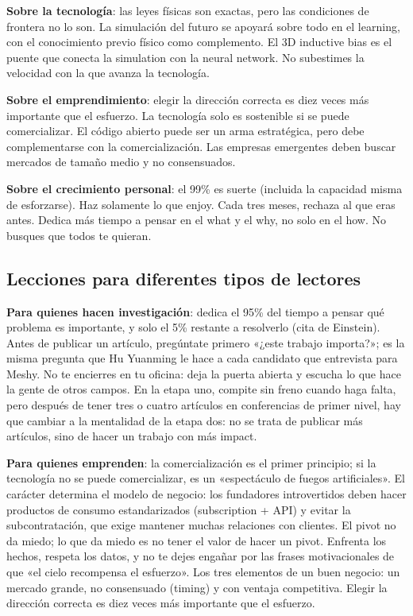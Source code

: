 \documentclass[a4paper]{article}
\begin{document}
\textbf{Sobre la tecnología}: las leyes físicas son exactas, pero las condiciones de frontera no lo son. La simulación del futuro se apoyará sobre todo en el learning, con el conocimiento previo físico como complemento. El 3D inductive bias es el puente que conecta la simulation con la neural network. No subestimes la velocidad con la que avanza la tecnología.

\textbf{Sobre el emprendimiento}: elegir la dirección correcta es diez veces más importante que el esfuerzo. La tecnología solo es sostenible si se puede comercializar. El código abierto puede ser un arma estratégica, pero debe complementarse con la comercialización. Las empresas emergentes deben buscar mercados de tamaño medio y no consensuados.

\textbf{Sobre el crecimiento personal}: el 99\% es suerte (incluida la capacidad misma de esforzarse). Haz solamente lo que enjoy. Cada tres meses, rechaza al que eras antes. Dedica más tiempo a pensar en el what y el why, no solo en el how. No busques que todos te quieran.

\subsection{Lecciones para diferentes tipos de lectores}

\textbf{Para quienes hacen investigación}: dedica el 95\% del tiempo a pensar qué problema es importante, y solo el 5\% restante a resolverlo (cita de Einstein). Antes de publicar un artículo, pregúntate primero «¿este trabajo importa?»; es la misma pregunta que Hu Yuanming le hace a cada candidato que entrevista para Meshy. No te encierres en tu oficina: deja la puerta abierta y escucha lo que hace la gente de otros campos. En la etapa uno, compite sin freno cuando haga falta, pero después de tener tres o cuatro artículos en conferencias de primer nivel, hay que cambiar a la mentalidad de la etapa dos: no se trata de publicar más artículos, sino de hacer un trabajo con más impact.

\textbf{Para quienes emprenden}: la comercialización es el primer principio; si la tecnología no se puede comercializar, es un «espectáculo de fuegos artificiales». El carácter determina el modelo de negocio: los fundadores introvertidos deben hacer productos de consumo estandarizados (subscription + API) y evitar la subcontratación, que exige mantener muchas relaciones con clientes. El pivot no da miedo; lo que da miedo es no tener el valor de hacer un pivot. Enfrenta los hechos, respeta los datos, y no te dejes engañar por las frases motivacionales de que «el cielo recompensa el esfuerzo». Los tres elementos de un buen negocio: un mercado grande, no consensuado (timing) y con ventaja competitiva. Elegir la dirección correcta es diez veces más importante que el esfuerzo.
\end{document}
